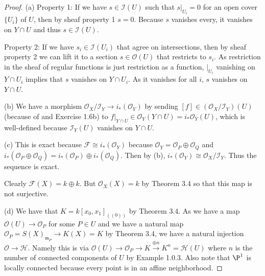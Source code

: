 \begin{proof}
	(a) Property 1: If we have $s \in \mathscr{I}(U) $ such that $s|_{U_i} = 0 $ for an open cover $\{U_i\}   $ of $U $, then by sheaf property 1 $s=0 $.
	Because $s$ vanishes every, it vanishes on $Y \cap U $ and thus $s \in \mathscr{I}(U) $.

	Property 2: If we have $s_i \in \mathscr{I}(U_i) $ that agree on intersections, then by sheaf property 2 we can lift it to a section $s \in \mathscr{O}(U) $ that restricts to $s_i $.
	As restriction in the sheaf of regular functions is just restriction as a function, $|_{U_i} $ vanishing on $Y\cap U_i $ implies that $s $ vanishes on $Y\cap U_i $.
	As it vanishes for all $i $, $s $ vanishes on $Y \cap U $.

	(b) We have a morphism $\mathscr{O}_X / \mathscr{I}_Y \to i_\ast(\mathscr{O}_Y) $ by sending $[f] \in (\mathscr{O}_X / \mathscr{I}_Y)(U) $ (because of  and Exercise 1.6b) to $f|_{Y\cap U} \in \mathscr{O}_Y(Y \cap U) = i_\ast\mathscr{O}_Y(U) $, which is well-defined because $\mathscr{I}_Y(U) $ vanishes on $Y\cap U $.

	(c) This is exact because $\mathscr{F} \cong i_\ast(\mathscr{O}_Y)  $ because $\mathscr{O}_Y = \mathscr{O}_P \oplus \mathscr{O}_Q $ and $i_\ast(\mathscr{O}_P \oplus \mathscr{O}_Q) = i_\ast(\mathscr{O}_P) \oplus i_\ast(\mathscr{O}_Q)$.
	Then by (b), $i_\ast(\mathscr{O}_Y) \cong \mathscr{O}_X / \mathscr{I}_Y $.
	Thus the sequence is exact.

	Clearly $\mathscr{F}(X) = k \oplus k $.
	But $\mathscr{O}_X(X) = k $ by Theorem 3.4 so that this map is not surjective.

	(d) We have that $K = k[x_{0},x_{1}]_{((0))}$ by Theorem 3.4. 
	As we have a map $\mathscr{O}(U) \to \mathscr{O}_P $ for some $P \in U $ and we have a natural map $\mathscr{O}_P = S(X)_{\mathfrak{m}_P} \to K(X) = K $ by Theorem 3.4, we have a natural injection $\mathscr{O}\to \mathscr{H} $.
	Namely this is via $\mathscr{O}(U) \to \mathscr{O}_P \to K \xrightarrow{\oplus n} K^n = \mathscr{H}(U) $ where $n $ is the number of connected components of $U $ by Example 1.0.3.
	Also note that $\P^1 $ is locally connected because every point is in an affine neighborhood.


\end{proof}
